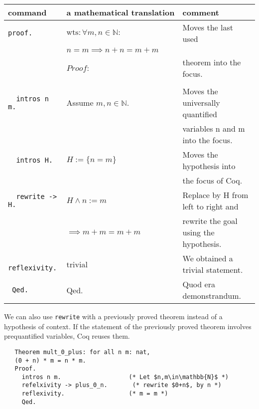      \begin{center}
     \begin{tabular} {|l|l|l|}
     	\hline
     	  command                        & a mathematical translation          & comment \\  \hline
     	 \lstinline!proof.!              & $\text{wts}: \forall m,n \in \mathbb{N}:$ & Moves the last used \\   
     	      	                         &  $n = m \implies n+n = m+m \qquad$  &         \\     
     	      	                         &  $Proof:$                           & theorem into the focus.\\  
       	                                 &                                     &                                    \\   \hline
         \lstinline!  intros n m.!       & Assume $m,n \in \mathbb{N}.$        & Moves the universally quantified \\
                                         &                                     & variables n and m into the focus.   \\   \hline                                            
          \lstinline!  intros H.!        & $H :=\{n=m\}$                       & Moves the hypothesis into              \\ 
    	                                 &                                     & the focus of Coq.                                          \\    \hline   
     	 \lstinline!  rewrite -> H.!     &  $H \wedge n:=m$                                   & Replace by H from left to right and                            \\  
     	                                 &  $\implies m+m = m+m$& rewrite the goal using the hypothesis.           \\ \hline
     	 \lstinline!  reflexivity.!      & trivial                             &  We obtained a trivial statement.                 \\ \hline
    	 \lstinline! Qed.!                & Qed.                                &  Quod era demonstrandum.                         \\  \hline
    	 
     \end{tabular}
     \end{center}         
   We can also use \lstinline!rewrite! with a previously proved theorem instead of a hypothesis of context.
   If the statement of the previously proved theorem involves prequantified variables, Coq reuses them.   
   \begin{lstlisting}
   Theorem mult_0_plus: for all n m: nat,
   (0 + n) * m = n * m.
   Proof.
     intros n m.                   (* Let $n,m\in\mathbb{N}$ *) 
     refelxivity -> plus_0_n.       (* rewrite $0+n$, by n *)
     reflexivity.                  (* m = m *)
     Qed.
   \end{lstlisting}   

